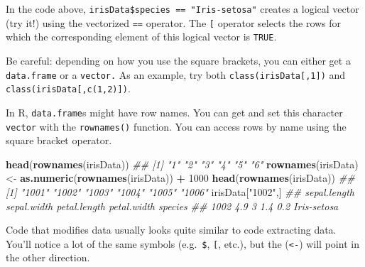 \documentclass[12pt,krantz2]{krantz}
\makeatletter
\newenvironment{Shaded}{\begin{snugshade}}{\end{snugshade}}
\newcommand{\CommentTok}[1]{\textcolor[rgb]{0.37,0.37,0.37}{\textit{#1}}}
\newcommand{\DecValTok}[1]{\textcolor[rgb]{0.06,0.06,0.06}{#1}}
\newcommand{\KeywordTok}[1]{\textcolor[rgb]{0.27,0.27,0.27}{\textbf{#1}}}
\newcommand{\NormalTok}[1]{#1}
\newcommand{\OperatorTok}[1]{\textcolor[rgb]{0.43,0.43,0.43}{\textbf{#1}}}
\newcommand{\StringTok}[1]{\textcolor[rgb]{0.5,0.5,0.5}{#1}}
\newenvironment{kframe}{%
\medskip{}
\setlength{\fboxsep}{.8em}
 \def\at@end@of@kframe{}%
 \ifinner\ifhmode%
  \def\at@end@of@kframe{\end{minipage}}%
  \begin{minipage}{\columnwidth}%
 \fi\fi%
 \def\FrameCommand##1{\hskip\@totalleftmargin \hskip-\fboxsep
 \colorbox{shadecolor}{##1}\hskip-\fboxsep
     \hskip-\linewidth \hskip-\@totalleftmargin \hskip\columnwidth}%
 \MakeFramed {\advance\hsize-\width
   \@totalleftmargin\z@ \linewidth\hsize
   \@setminipage}}%
 {\par\unskip\endMakeFramed%
 \at@end@of@kframe}
\renewenvironment{Shaded}{\begin{kframe}}{\end{kframe}}
\makeatother
\begin{document}
In the code above, \texttt{irisData\$species\ ==\ "Iris-setosa"} creates a logical vector (try it!) using the vectorized \texttt{==} operator. The \texttt{{[}} operator selects the rows for which the corresponding element of this logical vector is \texttt{TRUE}.

\begin{rmd-details}
Be careful: depending on how you use the square brackets, you can either get a \texttt{data.frame} or a \texttt{vector.} As an example, try both \texttt{class(irisData{[},1{]})} and \texttt{class(irisData{[},c(1,2){]})}.

\end{rmd-details}

In R, \texttt{data.frame}s might have row names. You can get and set this character \texttt{vector} with the \texttt{rownames()} function. You can access rows by name using the square bracket operator.

\begin{Shaded}
\begin{Highlighting}[]
\KeywordTok{head}\NormalTok{(}\KeywordTok{rownames}\NormalTok{(irisData))}
\CommentTok{## [1] "1" "2" "3" "4" "5" "6"}
\KeywordTok{rownames}\NormalTok{(irisData) <-}\StringTok{ }\KeywordTok{as.numeric}\NormalTok{(}\KeywordTok{rownames}\NormalTok{(irisData)) }\OperatorTok{+}\StringTok{ }\DecValTok{1000}
\KeywordTok{head}\NormalTok{(}\KeywordTok{rownames}\NormalTok{(irisData))}
\CommentTok{## [1] "1001" "1002" "1003" "1004" "1005" "1006"}
\NormalTok{irisData[}\StringTok{"1002"}\NormalTok{,]}
\CommentTok{##      sepal.length sepal.width petal.length petal.width     species}
\CommentTok{## 1002          4.9           3          1.4         0.2 Iris-setosa}
\end{Highlighting}
\end{Shaded}

Code that modifies data usually looks quite similar to code extracting data. You'll notice a lot of the same symbols (e.g.~\texttt{\$}, \texttt{{[}}, etc.), but the (\texttt{\textless{}-}) will point in the other direction.
\end{document}
